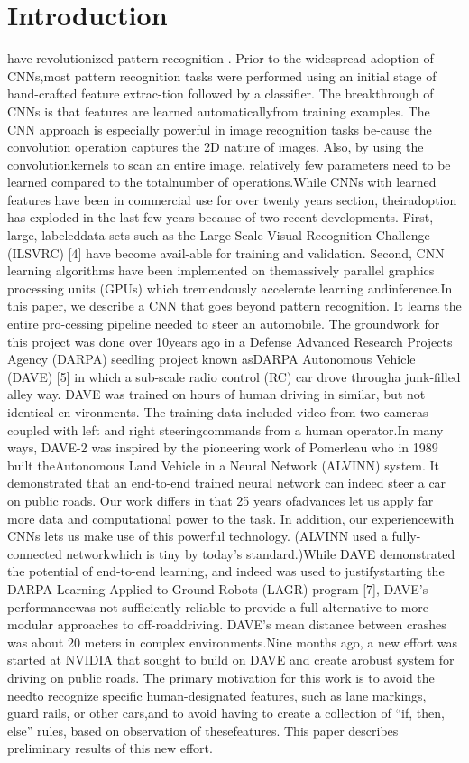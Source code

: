 \documentclass[a4paper]{article}
\begin{document}
		\section{Introduction}
		have revolutionized pattern recognition \cite{Sh:1} .  Prior to the widespread adoption of CNNs,most pattern recognition tasks were performed using an initial stage of hand-crafted feature extrac-tion followed by a classifier.  The breakthrough of CNNs is that features are learned automaticallyfrom training examples.  The CNN approach is especially powerful in image recognition tasks be-cause the convolution operation captures the 2D nature of images.  Also, by using the convolutionkernels to scan an entire image, relatively few parameters need to be learned compared to the totalnumber of operations.While CNNs with learned features have been in commercial use for over twenty years section,  theiradoption has exploded in the last few years because of two recent developments. First, large, labeleddata sets such as the Large Scale Visual Recognition Challenge (ILSVRC) [4] have become avail-able for training and validation.  Second, CNN learning algorithms have been implemented on themassively parallel graphics processing units (GPUs) which tremendously accelerate learning andinference.In this paper,  we describe a CNN that goes beyond pattern recognition.   It learns the entire pro-cessing pipeline needed to steer an automobile.  The groundwork for this project was done over 10years ago in a Defense Advanced Research Projects Agency (DARPA) seedling project known asDARPA Autonomous Vehicle (DAVE) [5] in which a sub-scale radio control (RC) car drove througha junk-filled alley way. DAVE was trained on hours of human driving in similar, but not identical en-vironments. The training data included video from two cameras coupled with left and right steeringcommands from a human operator.In many ways, DAVE-2 was inspired by the pioneering work of Pomerleau \cite{Sh:2} who in 1989 built theAutonomous Land Vehicle in a Neural Network (ALVINN) system. It demonstrated that an end-to-end trained neural network can indeed steer a car on public roads. Our work differs in that 25 years ofadvances let us apply far more data and computational power to the task. In addition, our experiencewith CNNs lets us make use of this powerful technology. (ALVINN used a fully-connected networkwhich is tiny by today’s standard.)While  DAVE  demonstrated  the  potential  of  end-to-end  learning,  and  indeed  was  used  to  justifystarting the DARPA Learning Applied to Ground Robots (LAGR) program [7], DAVE’s performancewas not sufficiently reliable to provide a full alternative to more modular approaches to off-roaddriving. DAVE’s mean distance between crashes was about 20 meters in complex environments.Nine months ago, a new effort was started at NVIDIA that sought to build on DAVE and create arobust system for driving on public roads. The primary motivation for this work is to avoid the needto recognize specific human-designated features, such as lane markings, guard rails, or other cars,and to avoid having to create a collection of “if, then, else” rules, based on observation of thesefeatures. This paper describes preliminary results of this new effort.
\end{document}
